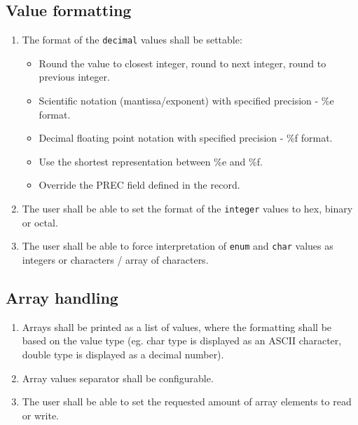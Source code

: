 \documentclass[12pt,a4paper]{article}
\begin{document}
\subsection{Value formatting}
\begin{enumerate}
	\item The format of the \texttt{decimal} values shall be settable:
	\begin{itemize}
		\item Round the value to closest integer, round to next integer, round to previous integer.
		\item Scientific notation (mantissa/exponent) with specified precision - \%e format.
		\item Decimal floating point notation with specified precision - \%f format.
		\item Use the shortest representation between \%e and \%f.
		\item Override the PREC field defined in the record.
	\end{itemize}
	\item The user shall be able to set the format of the \texttt{integer} values to hex, binary or octal.
	\item The user shall be able to force interpretation of \texttt{enum} and \texttt{char} values as integers or characters / array of characters.
\end{enumerate}

\subsection{Array handling}
\begin{enumerate}
	\item Arrays shall be printed as a list of values, where the formatting shall be based on the value type (eg. char type is displayed as an ASCII character, double type is displayed as a decimal number).
	\item Array values separator shall be configurable.
	\item The user shall be able to set the requested amount of array elements to read or write.
\end{enumerate}
\end{document}
